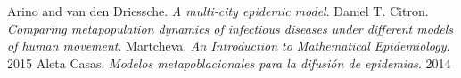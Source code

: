 \documentclass[a4paper,10pt,twocolumn]{article}
\begin{document}



\begin{thebibliography}{99}
	 Arino and van den Driessche. \emph{A multi-city epidemic model}.
	 Daniel T. Citron. \emph{Comparing metapopulation dynamics of infectious diseases under different models of human movement}.
	 Martcheva. \emph{An Introduction to Mathematical Epidemiology}. 2015
	 Aleta Casas. \emph{Modelos metapoblacionales para la difusión de epidemias}. 2014
	
\end{thebibliography}


\label{end}
\end{document}

